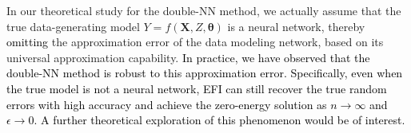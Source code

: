\documentclass[11pt]{article}
\newcommand{\bX}{{\boldsymbol X}}
\newcommand{\bY}{{\boldsymbol Y}}
\newcommand{\bx}{{\boldsymbol x}}
\newcommand{\bZ}{{\boldsymbol Z}}
\newcommand{\bw}{{\boldsymbol w}}
\newcommand{\btheta}{{\boldsymbol \theta}}
\begin{document}
In our theoretical study for the double-NN method, we actually assume that the true data-generating model $Y=f(\bX,Z,\btheta)$ is a neural network, thereby \textcolor{black}{omitting} the approximation error of the data modeling network, based on its universal approximation capability. \textcolor{black}{
In practice, we have observed that the double-NN method is robust to this  approximation error. Specifically, even when the true model is not a neural network, EFI can still recover the true random errors with high accuracy and achieve the zero-energy solution as $n\to \infty$ and $\epsilon\to 0$. A further theoretical exploration of this phenomenon would be of interest.}



 
\end{document}
